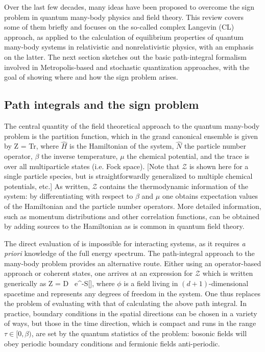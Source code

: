 \documentclass[../main.tex]{subfiles}
\begin{document}
Over the last few decades, many ideas have been proposed to overcome the sign problem in quantum many-body physics and field theory. This review covers some of them briefly and focuses on the so-called complex Langevin (CL) approach, as applied to the calculation of equilibrium properties of quantum many-body systems in relativistic and nonrelativistic physics, with an emphasis on the latter. The next section sketches out the basic path-integral formalism involved in Metropolis-based and stochastic quantization approaches, with the goal of showing where and how the sign problem arises.

\subsection{Path integrals and the sign problem}

The central quantity of the field theoretical approach to the quantum many-body problem is the partition function,
which in the grand canonical ensemble is given by
%
\beq
\label{Eq:Z}
\mathcal Z = \textrm{Tr} ,
\eeq
%
where $\hat H$ is the Hamiltonian of the system, $\hat N$ the particle number operator, $\beta$ the inverse
temperature, $\mu$ the chemical potential, and the trace is over all multiparticle states (i.e. Fock space).
[Note that $\mathcal Z$ is shown here for a single particle species, but is straightforwardly generalized to multiple chemical potentials, etc.] As written, $\mathcal Z$ contains the thermodynamic information of the system: by differentiating with respect to $\beta$ and $\mu$ one obtains expectation values of the Hamiltonian and the particle number operators. More detailed information, such as momentum distributions and other correlation functions, can be obtained by adding sources to the Hamiltonian as is common in quantum field theory.

The direct evaluation of  is impossible for interacting systems, as it requires \textit{a priori}
knowledge of the full energy spectrum. The path-integral approach to the many-body problem
provides an alternative route. Either using an operator-based approach or coherent states, one
arrives at an expression for $\mathcal Z$ which is written generically as
%
\beq
\label{Eq:PartitionZ}
\mathcal Z = \int \mathcal D \phi\ {\rm e}^{-S[\phi]},
\eeq
%
where $\phi$ is a field living in $(d+1)$-dimensional spacetime and represents any degrees of freedom in the system.
One thus replaces the problem of evaluating  with that of calculating the above path integral.
In practice, boundary conditions in the spatial directions can be chosen in a variety of ways, but those in the time
direction, which is compact and runs in the range $\tau \in [0,\beta)$, are set by the quantum statistics of the problem:
bosonic fields will obey periodic boundary conditions and fermionic fields anti-periodic.
\end{document}
